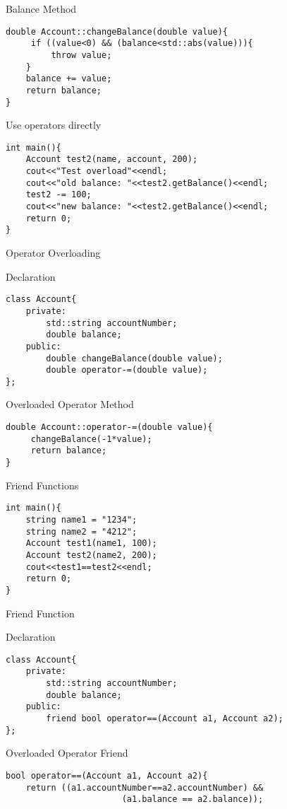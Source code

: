 \documentclass[xcolor={dvipsnames}]{beamer}
\begin{document}
\begin{frame}[fragile]{Balance Method}
\begin{verbatim}
double Account::changeBalance(double value){
     if ((value<0) && (balance<std::abs(value))){
         throw value;
    }
    balance += value;
    return balance;
}     
\end{verbatim}
\end{frame}

\begin{frame}[fragile]{Use operators directly}
\begin{verbatim}
int main(){
    Account test2(name, account, 200);
    cout<<"Test overload"<<endl;
    cout<<"old balance: "<<test2.getBalance()<<endl;
    test2 -= 100;
    cout<<"new balance: "<<test2.getBalance()<<endl;
    return 0;
}
\end{verbatim}
\end{frame}

\begin{frame}[fragile]{Operator Overloading}
\begin{block}{Declaration}
\begin{verbatim}
class Account{
    private:
        std::string accountNumber;
        double balance;
    public:
        double changeBalance(double value);
        double operator-=(double value);
};
\end{verbatim}
\end{block}
\pause
\begin{block}{Overloaded Operator Method}
\begin{verbatim}
double Account::operator-=(double value){
     changeBalance(-1*value);
     return balance;
}
\end{verbatim}
\end{block}
\end{frame}

\begin{frame}[fragile]{Friend Functions}
\begin{verbatim}
int main(){
    string name1 = "1234";
    string name2 = "4212";
    Account test1(name1, 100);
    Account test2(name2, 200);
    cout<<test1==test2<<endl;
    return 0;
}
\end{verbatim}
\end{frame}

\begin{frame}[fragile]{Friend Function}
\begin{block}{Declaration}
\begin{verbatim}
class Account{
    private:
        std::string accountNumber;
        double balance;
    public:
        friend bool operator==(Account a1, Account a2);
};
\end{verbatim}
\end{block}
\pause
\begin{block}{Overloaded Operator Friend}
\begin{verbatim}
bool operator==(Account a1, Account a2){
	return ((a1.accountNumber==a2.accountNumber) && 
                       (a1.balance == a2.balance));
\end{verbatim}
\end{block}
\end{frame}
\end{document}
